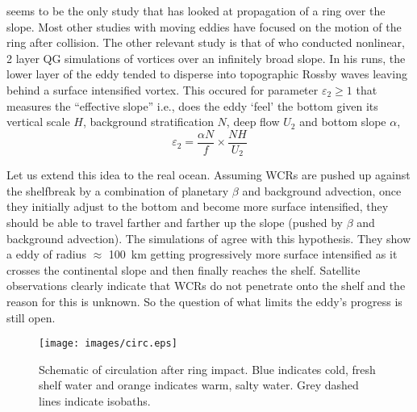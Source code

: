 
\cite{Hyun2008} seems to be the only study that has looked at propagation of a ring over the slope. Most other studies with moving eddies have focused on the motion of the ring after collision. The other relevant study is that of \cite{LaCasce1998} who conducted nonlinear, 2 layer QG simulations of vortices over an infinitely broad slope. In his runs, the lower layer of the eddy tended to disperse into topographic Rossby waves leaving behind a surface intensified vortex. This occured for parameter $ε_2 \ge 1 $ that measures the “effective slope” i.e., does the eddy ‘feel’ the bottom given its vertical scale $H$, background stratification $N$, deep flow $U_2$ and bottom slope $α$, 
\[ ε_2 = \frac{αN}{f} × \frac{NH}{U_2} \] 

Let us extend this idea to the real ocean. Assuming WCRs are pushed up against the shelfbreak by a combination of planetary $β$ and background advection, once they initially adjust to the bottom and become more surface intensified, they should be able to travel farther and farther up the slope (pushed by $β$ and background advection). The simulations of \cite{Hyun2008} agree with this hypothesis. They show a eddy of radius $\approx$ \SI{100}{\km} getting progressively more surface intensified as it crosses the continental slope and then finally reaches the shelf. Satellite observations clearly indicate that WCRs do not penetrate onto the shelf and the reason for this is unknown. So the question of what limits the eddy’s progress is still open. 


\begin{figure}[h]
    \centering
    \texttt{[image: images/circ.eps]}
    \caption{Schematic of circulation after ring impact. Blue indicates cold, fresh shelf water and orange indicates warm, salty water. Grey dashed lines indicate isobaths.}
    \label{fig:circ}
\end{figure}

